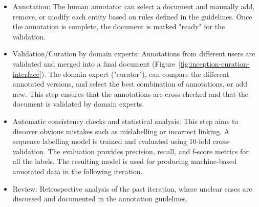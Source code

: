 \documentclass[fleqn,10pt]{wlscirep}
\begin{document}
\begin{itemize}
\item Annotation: The human annotator can select a document and manually add, remove, or modify each entity based on rules defined in the guidelines. Once the annotation is complete, the document is marked "ready" for the validation. 

\item Validation/Curation by domain experts: Annotations from different users are validated and merged into a final document (Figure~\ref{fig:inception-curation-interface}). 
The domain expert ("curator"), can compare the different annotated versions, and select the best combination of annotations, or add new. 
This step ensures that the annotations are cross-checked and that the document is validated by domain experts.

\item Automatic consistency checks and statistical analysis: This step aims to discover obvious mistakes such as mislabelling or incorrect linking. 
A sequence labelling model is trained and evaluated using 10-fold cross-validation. The evaluation provides precision, recall, and f-score metrics for all the labels.
The resulting model is used for producing machine-based annotated data in the following iteration.

\item Review: Retrospective analysis of the past iteration, where unclear cases are discussed and documented in the annotation guidelines. 

\end{itemize}
\end{document}
